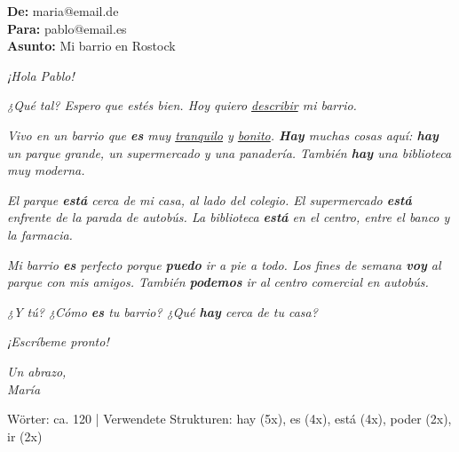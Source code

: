 \documentclass[11pt, a4paper]{article}
\begin{document}
\vspace{0.3cm}


\begin{tcolorbox}[
    colback=gruppeA!10,
    colframe=gruppeA,
    title={\color{white}\bfseries Beispiel-E-Mail (Muster)},
    fonttitle=\bfseries
]

\textbf{De:} maria@email.de\\
\textbf{Para:} pablo@email.es\\
\textbf{Asunto:} Mi barrio en Rostock

\vspace{0.3cm}

\textit{¡Hola Pablo!}

\textit{¿Qué tal? Espero que estés bien. Hoy quiero \underline{describir} mi barrio.}

\textit{Vivo en un barrio que \textbf{es} muy \underline{tranquilo} y \underline{bonito}. \textbf{Hay} muchas cosas aquí: \textbf{hay} un parque grande, un supermercado y una panadería. También \textbf{hay} una biblioteca muy moderna.}

\textit{El parque \textbf{está} cerca de mi casa, al lado del colegio. El supermercado \textbf{está} enfrente de la parada de autobús. La biblioteca \textbf{está} en el centro, entre el banco y la farmacia.}

\textit{Mi barrio \textbf{es} perfecto porque \textbf{puedo} ir a pie a todo. Los fines de semana \textbf{voy} al parque con mis amigos. También \textbf{podemos} ir al centro comercial en autobús.}

\textit{¿Y tú? ¿Cómo \textbf{es} tu barrio? ¿Qué \textbf{hay} cerca de tu casa?}

\textit{¡Escríbeme pronto!}

\textit{Un abrazo,}\\
\textit{María}

\vspace{0.2cm}
\footnotesize\textcolor{spanisch}{Wörter: ca. 120 | Verwendete Strukturen: hay (5x), es (4x), está (4x), poder (2x), ir (2x)}
\end{tcolorbox}

\vspace{0.3cm}

\end{document}
